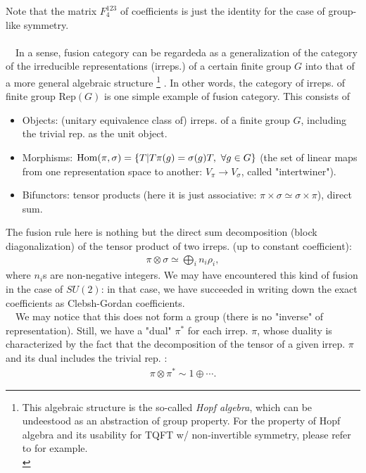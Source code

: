\documentclass{ltjsarticle}
\theoremstyle{mystyle} %
\numberwithin{equation}{section}
\begin{document}
  Note that the matrix $F_{4}^{123}$ of coefficients is just the identity for the case of group-like symmetry. 
  \\\\
  　In a sense, fusion category can be regardeda as a generalization of the category of
  the irreducible representations (irreps.) of a certain finite group $G$ 
  into that of a more general algebraic structure
  \footnote{This algebraic structure is the so-called \textit{Hopf algebra}, 
  which can be undeestood as an abstraction of group property. 
  For the property of Hopf algebra and its usability for TQFT w/ non-invertible symmetry, 
  please refer to \cite{KI} for example. \\
  }
  . 
  In other words, the category of irreps. of finite group $\mathrm{Rep}(G)$ is one simple example of fusion category. 
  This consists of 
  \begin{itemize}
    \item Objects: (unitary equivalence class of) irreps. of a finite group $G$, including the trivial rep. as the unit object. 
    \item Morphisms: $\mathrm{Hom}(\pi, \sigma) = \left\{{T|T\pi(g) = \sigma(g)T, ~\forall g\in G}\right\}$ 
    (the set of linear maps from one representation space to another: $V_\pi\to V_\sigma$, called "intertwiner"). 
    \item Bifunctors: tensor products (here it is just associative: $\pi\times \sigma \simeq \sigma\times \pi$), direct sum. 
  \end{itemize}
  The fusion rule here is nothing but the direct sum decomposition (block diagonalization) of the tensor product of two irreps. 
  (up to constant coefficient): 
  \begin{align}
    \pi \otimes \sigma \simeq \bigoplus_i n_i \rho_i, 
  \end{align}
  where $n_i$s are non-negative integers. 
  We may have encountered this kind of fusion in the case of $SU(2)$: 
  in that case, we have succeeded in writing down the exact coefficients as 
  Clebsh-Gordan coefficients. \\
　We may notice that this does not form a group (there is no "inverse" of representation). 
Still, we have a "dual" $\pi^*$ for each irrep. $\pi$, whose duality is characterized by the fact that
 the decomposition of the tensor of a given irrep. $\pi$ and its dual includes the trivial rep. : 
 \begin{align}
    \pi\otimes \pi^* \sim 1\oplus \cdots. 
 \end{align}
\end{document}
